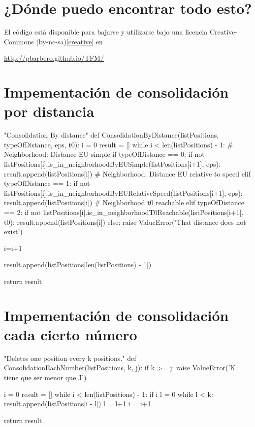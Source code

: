 \documentclass[a4paper, 12pt]{article}
\begin{document}
\pagebreak

\section{¿D\'onde puedo encontrar todo esto?}

El c\'odigo est\'a disponible para bajarse y utilizarse bajo una licencia Creative-Commons (by-nc-sa)\ref{creative}
en \\ 
\smallskip

\href{http://pbarbero.github.io/TFM/}{http://pbarbero.github.io/TFM/}

\newpage


\appendix
\section{Impementaci\'on de consolidaci\'on por distancia} \label{App:AppendixA}

\begin{python}
"Consolidation By distance"
def ConsolidationByDistance(listPositions, typeOfDistance, eps, t0):
	i = 0
	result = []
	while i < len(listPositions) - 1:
		# Neighborhood: Distance EU simple
		if typeOfDistance == 0:
			if not listPositions[i].is_in_neighborhoodByEUSimple(listPositions[i+1], eps):
				result.append(listPositions[i])
		# Neighborhood: Distance EU relative to speed
		elif typeOfDistance == 1:
			if not listPositions[i].is_in_neighborhoodByEURelativeSpeed(listPositions[i+1], eps):
				result.append(listPositions[i])
		# Neighborhood t0 reachable
		elif typeOfDistance == 2:
			if not listPositions[i].is_in_neighborhoodT0Reachable(listPositions[i+1], t0):
				result.append(listPositions[i])
		else:
			raise ValueError('That distance does not exist')

		i=i+1

	result.append(listPositions[len(listPositions) - 1])

	return result

\end{python}

\newpage
\section{Impementaci\'on de consolidaci\'on cada cierto n\'umero} \label{App:AppendixB}

\begin{python}
"Deletes one position every k positions."
def ConsolidationEachNumber(listPositions, k, j):
	if k >= j:
		raise ValueError('K tiene que ser menor que J')
        
	i = 0
	result = []
	while i < len(listPositions) - 1:
		if i%
			l = 0
			while l < k:
				result.append(listPositions[i - l])
				l = l+1
			i = i+1

	return result
\end{python}
\end{document}
